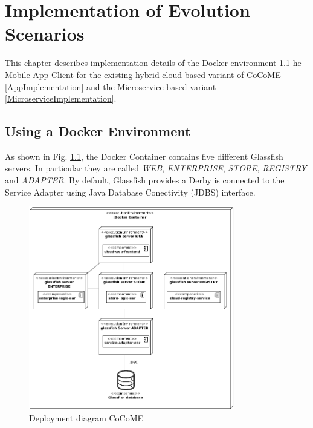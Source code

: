 \chapter{Implementation of Evolution Scenarios}
\label{c:implementation}
This chapter describes implementation details of the Docker environment \ref{DockerImplementation}\deleted{,} 
he Mobile App Client for the existing hybrid cloud-based variant of CoCoME \deleted{(}\ref{AppImplementation}\deleted{)} and the Microservice-based variant \deleted{(}\ref{MicroserviceImplementation}\deleted{)}.


\section{Using a Docker Environment}\label{DockerImplementation}
 	As shown in Fig. \ref*{Deploym_CoCoME}, the Docker Container contains five different Glassfish servers. In particular they are called \textit{WEB}, \textit{ENTERPRISE}, \textit{STORE}, \textit{REGISTRY} and \textit{ADAPTER}. 
 	By default, Glassfish provides a Derby 
 	 is connected to the Service Adapter using  Java Database Conectivity (JDBS) interface.
 	\begin{figure}[h]
 		\centering
 		\includegraphics[width = 0.8\textwidth]{img/docker_Container_Deployment.png}
 		\caption{Deployment diagram CoCoME}
 		\label{Deploym_CoCoME}
 	\end{figure}
